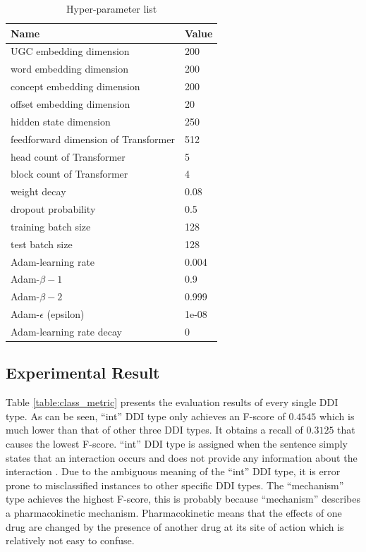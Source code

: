 \documentclass[conference]{IEEEtran}
\begin{document}
\begin{table}
\caption{Hyper-parameter list}
\label{table:hypers}
\centering
\begin{tabular}{ll}
\hline
 Name & Value\\ \hline
UGC embedding dimension & 200\\
 word embedding dimension & 200\\
 concept embedding dimension & 200\\
 offset embedding dimension & 20\\
 hidden state dimension & 250\\
 feedforward dimension of Transformer & 512 \\ 
 head count of Transformer & 5 \\  
 block count of Transformer & 4 \\  
 weight decay & 0.08\\
 dropout probability & 0.5 \\
 training batch size & 128 \\
 test batch size & 128 \\
 Adam-learning rate & 0.004\\
 Adam-$\beta-1$ & 0.9\\
 Adam-$\beta-2$ & 0.999\\
 Adam-$\epsilon$ (epsilon) & 1e-08\\
 Adam-learning rate decay & 0\\
 \hline
\end{tabular}
\end{table}

\subsection{Experimental Result}

Table \ref{table:class_metric} presents the evaluation results of every single DDI type.
As can be seen, ``int'' DDI type only achieves an F-score of $0.4545$ which is much lower than that of other three DDI types.
It obtains a recall of $0.3125$ that causes the lowest F-score.
``int'' DDI type is assigned when the sentence simply states that an interaction occurs
and does not provide any information about the interaction \cite{segura-bedmar_semeval-2013_2013}.
Due to the ambiguous meaning of the ``int'' DDI type, it is error prone to misclassified instances to other specific DDI types.
The ``mechanism'' type achieves the highest F-score, this is probably because ``mechanism'' describes a pharmacokinetic mechanism.
Pharmacokinetic means that the effects of one drug are changed by the presence of another drug at its site of action which is relatively not easy to confuse.
\end{document}
